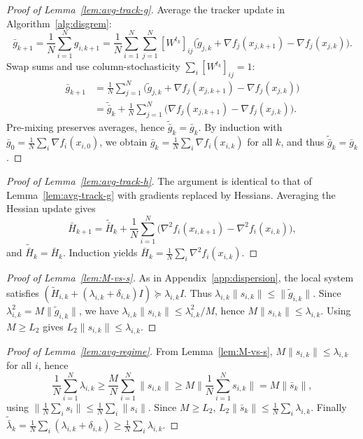 \documentclass[review,onefignum,onetabnum]{siamart171218}
\begin{document}
\begin{proof}[Proof of Lemma~\ref{lem:avg-track-g}]
Average the tracker update in Algorithm~\ref{alg:disgrem}:
\[
\bar g_{k+1}
=\frac1N\sum_{i=1}^N g_{i,k+1}
=\frac1N\sum_{i=1}^N\sum_{j=1}^N [W^{t_k}]_{ij}\Big(\tilde g_{j,k}+\nabla f_j(x_{j,k+1})-\nabla f_j(x_{j,k})\Big).
\]
Swap sums and use column-stochasticity $\sum_i [W^{t_k}]_{ij}=1$:
\begin{align*}
\bar g_{k+1}&=\tfrac1N\textstyle\sum_{j=1}^N\!\Big(\tilde g_{j,k}+\nabla f_j(x_{j,k+1})-\nabla f_j(x_{j,k})\Big)\\
&=\tilde{\bar g}_k+\tfrac1N\textstyle\sum_{j=1}^N\!\big(\nabla f_j(x_{j,k+1})-\nabla f_j(x_{j,k})\big).
\end{align*}
Pre-mixing preserves averages, hence $\tilde{\bar g}_k=\bar g_k$.
By induction with $\bar g_0=\frac1N\sum_i \nabla f_i(x_{i,0})$, we obtain
$\bar g_k=\frac1N\sum_i \nabla f_i(x_{i,k})$ for all $k$, and thus $\tilde{\bar g}_k=\bar g_k$.
\end{proof}

\begin{proof}[Proof of Lemma~\ref{lem:avg-track-h}]
The argument is identical to that of Lemma~\ref{lem:avg-track-g} with gradients replaced by Hessians.
Averaging the Hessian update gives
\[
\bar H_{k+1}=\tilde{\bar H}_k+\frac1N\sum_{i=1}^N\big(\nabla^2 f_i(x_{i,k+1})-\nabla^2 f_i(x_{i,k})\big),
\]
and $\tilde{\bar H}_k=\bar H_k$. Induction yields $\bar H_k=\frac1N\sum_i \nabla^2 f_i(x_{i,k})$.
\end{proof}

\begin{proof}[Proof of Lemma~\ref{lem:M-vs-s}]
As in Appendix~\ref{app:dispersion}, the local system satisfies
$(\tilde H_{i,k}+(\lambda_{i,k}+\delta_{i,k})I)\succeq \lambda_{i,k}I$.
Thus $\lambda_{i,k}\|s_{i,k}\|\le \|\tilde g_{i,k}\|$.
Since $\lambda_{i,k}^2=M\|\tilde g_{i,k}\|$, we have $\lambda_{i,k}\|s_{i,k}\|\le \lambda_{i,k}^2/M$,
hence $M\|s_{i,k}\|\le \lambda_{i,k}$. Using $M\ge L_2$ gives $L_2\|s_{i,k}\|\le\lambda_{i,k}$.
\end{proof}

\begin{proof}[Proof of Lemma~\ref{lem:avg-regime}]
From Lemma~\ref{lem:M-vs-s}, $M\|s_{i,k}\|\le \lambda_{i,k}$ for all $i$, hence
\[
\frac1N\sum_{i=1}^N\lambda_{i,k}\ge \frac{M}{N}\sum_{i=1}^N\|s_{i,k}\|\ge M\Big\|\frac1N\sum_{i=1}^N s_{i,k}\Big\|=M\|\bar s_k\|,
\]
using $\|\frac1N\sum_i s_i\|\le \frac1N\sum_i\|s_i\|$.
Since $M\ge L_2$, $L_2\|\bar s_k\|\le \frac1N\sum_i\lambda_{i,k}$.
Finally $\tilde{\bar\lambda}_k=\frac1N\sum_i(\lambda_{i,k}+\delta_{i,k})\ge \frac1N\sum_i\lambda_{i,k}$.
\end{proof}
\end{document}
